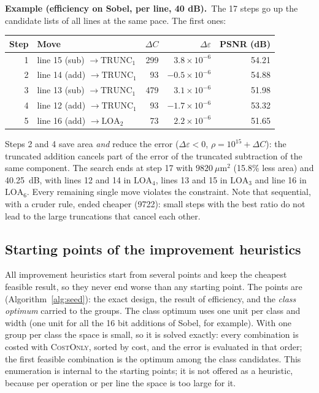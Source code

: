 \documentclass[11pt,a4paper]{article}
\newcommand{\examplebox}[2]{\par\medskip\noindent\colorbox{tabAzul!6}{\begin{minipage}{\dimexpr\linewidth-2\fboxsep}
  \textbf{Example (#1).}\ #2\end{minipage}}\par\medskip}
\begin{document}
\examplebox{efficiency on Sobel, per line, 40 dB}{The 17 steps go up the candidate lists of all lines at the same
pace. The first ones:
\begin{center}
\rowcolors{2}{gray!10}{white}
\begin{tabular}{|r|l|r|r|r|}
\hline
\rowcolor{tabAzul}\color{white} Step & \color{white} Move & \color{white} $\Delta C$ & \color{white} $\Delta\varepsilon$ & \color{white} PSNR (dB) \\
\hline
1 & line 15 (sub) $\to \text{TRUNC}_1$ & 299 & $3.8 \times 10^{-6}$ & 54.21 \\
2 & line 14 (add) $\to \text{TRUNC}_1$ & 93 & $-0.5 \times 10^{-6}$ & 54.88 \\
3 & line 13 (sub) $\to \text{TRUNC}_1$ & 479 & $3.1 \times 10^{-6}$ & 51.98 \\
4 & line 12 (add) $\to \text{TRUNC}_1$ & 93 & $-1.7 \times 10^{-6}$ & 53.32 \\
5 & line 16 (add) $\to \text{LOA}_2$ & 73 & $2.2 \times 10^{-6}$ & 51.65 \\
\hline
\end{tabular}
\end{center}
Steps 2 and 4 save area \emph{and} reduce the error ($\Delta\varepsilon < 0$, $\rho = 10^{15} + \Delta C$): the
truncated addition cancels part of the error of the truncated subtraction of the same component. The search ends at
step 17 with $9820\ \mu\text{m}^2$ (15.8\% less area) and 40.25~dB, with lines 12 and 14 in $\text{LOA}_4$, lines 13
and 15 in $\text{LOA}_3$ and line 16 in $\text{LOA}_6$. Every remaining single move violates the constraint. Note
that sequential, with a cruder rule, ended cheaper (9722): small steps with the best ratio do not lead to the large
truncations that cancel each other.}

\subsection{Starting points of the improvement heuristics}

All improvement heuristics start from several points and keep the cheapest feasible result, so they never end worse
than any starting point. The points are (Algorithm~\ref{alg:seed}): the exact design, the result of efficiency, and
the \emph{class optimum} carried to the groups. The class optimum uses one unit per class and width (one unit for all
the 16 bit additions of Sobel, for example). With one group per class the space is small, so it is solved exactly:
every combination is costed with \textsc{CostOnly}, sorted by cost, and the error is evaluated in that order; the first
feasible combination is the optimum among the class candidates. This enumeration is internal to the starting points;
it is not offered as a heuristic, because per operation or per line the space is too large for it.
\end{document}
